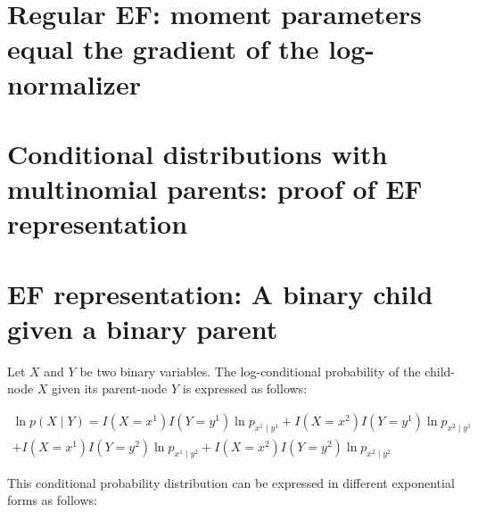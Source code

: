 \documentclass[11pt, oneside]{article}   	%
\numberwithin{figure}{section}
\numberwithin{equation}{section}
\numberwithin{table}{section}
\theoremstyle{definition}
\begin{document}
\begin{appendices}



\section{Regular EF: moment parameters equal the gradient of the log-normalizer}\label{appendix:regularEFequality}


\section{Conditional distributions with multinomial parents: proof of EF representation}\label{appendix:CD_With_MParents:Representation}

\section{EF representation: A binary child given a binary parent}

Let $X$ and $Y$ be two binary variables. The log-conditional probability of the child-node $X$ given its parent-node $Y$ is expressed as follows:

\begin{eqnarray*}
\ln p(X \mid Y) =  I(X= x^1) I(Y= y^1) \ln p_{x^1 \mid y^1} + I(X=x^2) I(Y= y^1) \ln p_{x^2 \mid y^1} \\
+ I(X=x^1) I(Y= y^2) \ln p_{x^1 \mid y^2} + I(X=x^2) I(Y= y^2) \ln p_{x^2 \mid y^2}
\end{eqnarray*}

This conditional probability distribution can be expressed in different exponential forms as follows:


\end{appendices}
\end{document}
